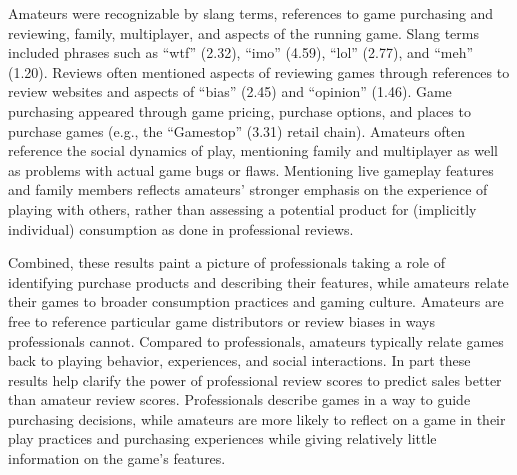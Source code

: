 \documentclass[letterpaper]{article}
\begin{document}
Amateurs were recognizable by slang terms, references to game purchasing and reviewing, family, multiplayer, and aspects of the running game. Slang terms included phrases such as ``wtf'' (2.32), ``imo'' (4.59), ``lol'' (2.77), and ``meh'' (1.20). Reviews often mentioned aspects of reviewing games through references to review websites and aspects of ``bias'' (2.45) and ``opinion'' (1.46). Game purchasing appeared through game pricing, purchase options, and places to purchase games (e.g., the ``Gamestop'' (3.31) retail chain). Amateurs often reference the social dynamics of play, mentioning family and multiplayer as well as problems with actual game bugs or flaws. Mentioning live gameplay features and family members reflects amateurs' stronger emphasis on the experience of playing with others, rather than assessing a potential product for (implicitly individual) consumption as done in professional reviews.


Combined, these results paint a picture of professionals taking a role of identifying purchase products and describing their features, while amateurs relate their games to broader consumption practices and gaming culture. Amateurs are free to reference particular game distributors or review biases in ways professionals cannot. Compared to professionals, amateurs typically relate games back to playing behavior, experiences, and social interactions. In part these results help clarify the power of professional review scores to predict sales better than amateur review scores. Professionals describe games in a way to guide purchasing decisions, while amateurs are more likely to reflect on a game in their play practices and purchasing experiences while giving relatively little information on the game's features.
\end{document}

